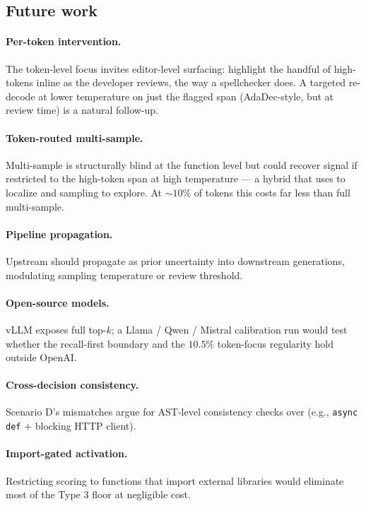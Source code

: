 \subsection{Future work}
\label{subsec:future}

\paragraph{Per-token intervention.}
The token-level focus invites editor-level surfacing: highlight the
handful of high-\eps tokens inline as the developer reviews, the
way a spellchecker does. A targeted re-decode at lower temperature
on just the flagged span (AdaDec-style, but at review time) is a
natural follow-up.

\paragraph{Token-routed multi-sample.}
Multi-sample is structurally blind at the function level but could
recover signal if restricted to the high-\eps token span at high
temperature --- a hybrid that uses \eps to localize and sampling to
explore. At $\sim 10\%$ of tokens this costs far less than full
multi-sample.

\paragraph{Pipeline propagation.}
Upstream \eps should propagate as prior uncertainty into downstream
generations, modulating sampling temperature or review threshold.

\paragraph{Open-source models.}
vLLM exposes full top-$k$; a Llama / Qwen / Mistral calibration run
would test whether the recall-first boundary and the $10.5\%$
token-focus regularity hold outside OpenAI.

\paragraph{Cross-decision consistency.}
Scenario D's mismatches argue for AST-level consistency checks over
\eps (e.g., \texttt{async def} $+$ blocking HTTP client).

\paragraph{Import-gated activation.}
Restricting \eps scoring to functions that import external libraries
would eliminate most of the Type 3 floor at negligible cost.

